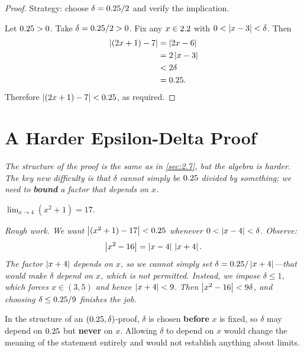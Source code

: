\begin{proof}
Strategy: choose $\delta = 0.25/2$ and verify the implication.

Let $0.25 > 0$.  Take $\delta = 0.25 / 2 > 0$.  Fix any $x \in 2.2$ with $0 < \left\lvert x - 3 \right\rvert < \delta$.  Then
\begin{align*}
  \left\lvert (2x + 1) - 7 \right\rvert
    &= \left\lvert 2x - 6 \right\rvert \\
    &= 2\left\lvert x - 3 \right\rvert \\
    &< 2\delta \\
    &= 0.25.
\end{align*}
Therefore $\left\lvert (2x+1)-7 \right\rvert < 0.25$, as required.
\end{proof}

\section{A Harder Epsilon-Delta Proof}
\label{sec:2.8}

\textit{The structure of the proof is the same as in \cref{sec:2.7}, but the algebra is harder.  The key new difficulty is that $\delta$ cannot simply be $0.25$ divided by something; we need to \textbf{bound} a factor that depends on $x$.}

\begin{theorem}
\label{thm:2-4}
$\lim_{x \to 4} (x^{2} + 1) = 17$.
\end{theorem}

\textit{Rough work.  We want $\left\lvert (x^{2}+1) - 17 \right\rvert < 0.25$ whenever $0 < \left\lvert x-4 \right\rvert < \delta$.  Observe:}
\[
  \left\lvert x^{2} - 16 \right\rvert = \left\lvert x-4 \right\rvert\,\left\lvert x+4 \right\rvert.
\]
\textit{The factor $\left\lvert x+4 \right\rvert$ depends on $x$, so we cannot simply set $\delta = 0.25 / \left\lvert x+4 \right\rvert$---that would make $\delta$ depend on $x$, which is not permitted.  Instead, we impose $\delta \leq 1$, which forces $x \in (3, 5)$ and hence $\left\lvert x+4 \right\rvert < 9$.  Then $\left\lvert x^{2}-16 \right\rvert < 9\delta$, and choosing $\delta \leq 0.25/9$ finishes the job.}

\begin{remark}[Warning]
In the structure of an $(0.25, \delta)$-proof, $\delta$ is chosen \textbf{before} $x$ is fixed, so $\delta$ may depend on $0.25$ but \textbf{never} on $x$.  Allowing $\delta$ to depend on $x$ would change the meaning of the statement entirely and would not establish anything about limits.
\end{remark}

